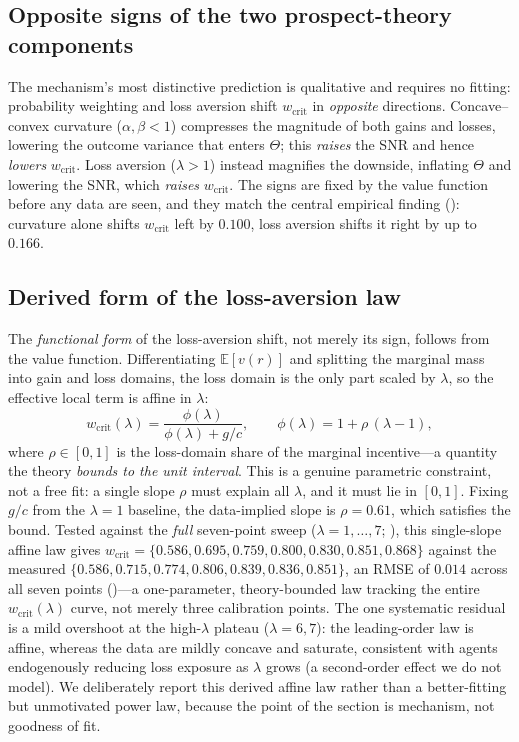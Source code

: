 \documentclass[11pt]{article}
\newcommand{\wcrit}{w_{\mathrm{crit}}}
\begin{document}
\subsection{Opposite signs of the two prospect-theory components}
The mechanism's most distinctive prediction is qualitative and requires no
fitting: probability weighting and loss aversion shift $\wcrit$ in
\emph{opposite} directions. Concave--convex curvature ($\alpha,\beta<1$)
compresses the magnitude of both gains and losses, lowering the outcome
variance that enters $\Theta$; this \emph{raises} the SNR and hence
\emph{lowers} $\wcrit$. Loss aversion ($\lambda>1$) instead magnifies the
downside, inflating $\Theta$ and lowering the SNR, which \emph{raises}
$\wcrit$. The signs are fixed by the value function before any data are
seen, and they match the central empirical finding
(): curvature alone shifts $\wcrit$ left by
$0.100$, loss aversion shifts it right by up to $0.166$.

\subsection{Derived form of the loss-aversion law}
The \emph{functional form} of the loss-aversion shift, not merely its sign,
follows from the value function. Differentiating $\mathbb{E}[v(r)]$ and
splitting the marginal mass into gain and loss domains, the loss domain is
the only part scaled by $\lambda$, so the effective local term is affine in
$\lambda$:
\begin{equation}
  \wcrit(\lambda)=\frac{\phi(\lambda)}{\phi(\lambda)+g/c},
  \qquad \phi(\lambda)=1+\rho\,(\lambda-1),
  \label{eq:wcrit_lambda}
\end{equation}
where $\rho\in[0,1]$ is the loss-domain share of the marginal incentive---a
quantity the theory \emph{bounds to the unit interval}. This is a genuine
parametric constraint, not a free fit: a single slope $\rho$ must explain
all $\lambda$, and it must lie in $[0,1]$. Fixing $g/c$ from the
$\lambda{=}1$ baseline, the data-implied slope is $\rho=0.61$, which
satisfies the bound. Tested against the \emph{full} seven-point sweep
($\lambda=1,\ldots,7$; ), this single-slope affine law
gives $\wcrit=\{0.586,0.695,0.759,0.800,0.830,0.851,0.868\}$ against the
measured $\{0.586,0.715,0.774,0.806,0.839,0.836,0.851\}$, an RMSE of $0.014$
across all seven points ()---a one-parameter, theory-bounded
law tracking the entire $\wcrit(\lambda)$ curve, not merely three calibration
points. The one systematic residual is a mild overshoot at the high-$\lambda$
plateau ($\lambda{=}6,7$): the leading-order law is affine, whereas the data are
mildly concave and saturate, consistent with agents endogenously reducing loss
exposure as $\lambda$ grows (a second-order effect we do not model). We deliberately report this derived affine law
rather than a better-fitting but unmotivated power law, because the point of
the section is mechanism, not goodness of fit.
\end{document}
